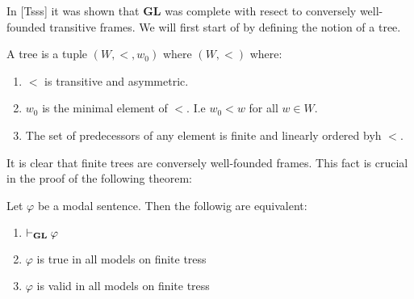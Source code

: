 \documentclass[../main.tex]{subfiles}
\begin{document}
In [Tsss] it was shown that \textbf{GL} was complete with resect to conversely
well-founded transitive frames. We will first start of by defining the notion
of a tree.

\begin{defi}
	A tree is a tuple $(W,<,w_0)$ where $(W,<)$ where:
	\begin{enumerate}
		\item $<$ is transitive and asymmetric.
		\item $w_0$ is the minimal element of $<$. I.e $w_0
			<w$ for all $w\in W$.
		\item The set of predecessors of any element is finite and
			linearly ordered byh $<$.
	\end{enumerate}
\end{defi}
It is clear that finite trees are conversely well-founded frames. This fact is crucial
in the proof of the following theorem:
\begin{thm}
	Let $\varphi$ be a modal sentence. Then the followig are equivalent:
	\begin{enumerate}
		\item $\vdash_{\text{\textbf{GL}}}\varphi$
		\item $\varphi$ is true in all models on finite tress
		\item $\varphi$ is valid in all models on finite tress
	\end{enumerate}
\end{thm}
\end{document}
